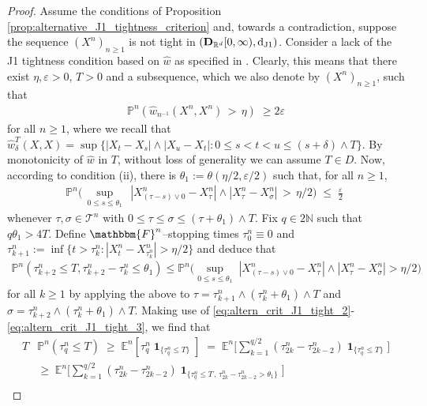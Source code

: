 \documentclass[11pt]{article}
\theoremstyle{definition}\newtheorem{example}[theorem]{Example}
\theoremstyle{definition}\newtheorem{counterexample}[theorem]{Counterexample}
\theoremstyle{definition}\newtheorem{remark}[theorem]{Remark}
\theoremstyle{definition}\newtheorem{defi}[theorem]{Definition}
\numberwithin{equation}{section}
\newcommand{\N}{\mathbb{N}}
\newcommand{\R}{\mathbb{R}}
\newcommand{\D}{{\bf D}}											%
\newcommand*\diff{\mathop{}\!\mathrm{d}}								%
\newcommand{\E}{\mathbb{E}}											%
\newcommand{\Pro}{\mathbb{P}}										%
\newcommand{\ind}{\operatorname{\mathbf{1}}}							%
\renewcommand{\sup}[1]{\underset{#1}{\operatorname{sup}}\;}					%
\renewcommand{\|}{\; : \, \;}											%
\newcommand{\dJ}{\diff_{\operatorname{J1}}}								%
\begin{document}
\begin{proof} Assume the conditions of Proposition \ref{prop:alternative_J1_tightness_criterion} and, towards a contradiction, suppose the sequence $(X^n)_{n \ge 1}$ is not tight in $(\D_{\R^d}[0,\infty), \dJ)$. Consider a lack of the J1 tightness condition based on $\hat w$ as specified in \cite[Thm.~12.4]{billingsley}. Clearly, this means that there exist $\eta,\varepsilon >0$, $T>0$ and a subsequence, which we also denote by $(X^{n})_{n\ge 1}$, such that 
	\begin{align}
		\Pro^n \left( \hat w_{n^{-1}}(X^n,X^n) \, > \, \eta \right) \; \ge 2\varepsilon \label{eq:altern_crit_J1_tight_1}
	\end{align}
	for all $n\ge 1$, where we recall that $\hat w^T_\delta(X,X)= \operatorname{sup}\{ |X_t-X_s| \wedge |X_u-X_t| : 0\le s < t<u\le (s+\delta)\wedge T\}$. By monotonicity of $\hat w$ in $T$, without loss of generality we can assume $T \in D$. Now, according to condition (ii), there 
	is $\theta_1:=\theta(\eta/2,\varepsilon/2)$ such that, for all $n\ge 1$,
	\begin{align} 
		\Pro^n\Big( \, \sup{0\le s \le \theta_1} \, |X^n_{(\tau-s)\vee 0}-X^n_\tau|\wedge |X^n_{\tau}-X^n_{\sigma}| \, > \, \eta/2 \Big) \; \le \; \frac \varepsilon 2\; \label{eq:altern_crit_J1_tight_2}
	\end{align}
	whenever $\tau, \sigma \in \mathcal{T}^n$ with $0\le \tau \le \sigma \le (\tau+ \theta_1)\wedge T$. Fix $q \in 2\N$ such that $q \theta_1> 4T$. Define $\mathbbm{F}^n$--stopping times $\tau^n_0 \equiv 0$ and $\tau^n_{k+1}:= \operatorname{inf}\{t>\tau^n_{k} : |X^n_t-X^n_{\tau^n_k}|> \eta/2\}$ and deduce that 
	\begin{align} 
		\Pro^n ( \tau^n_{k+2} \le T ,  \tau^n_{k+2}-\tau^n_{k} \le \theta_1) \le  \Pro^n\Big(  \sup{0\le s \le \theta_1}  |X^n_{(\tau -s)\vee 0}-X^n_{\tau}|\wedge |X^n_{\tau}-X^n_{\sigma}|  > \eta/2 \Big) \label{eq:altern_crit_J1_tight_3}
	\end{align}
	for all $k\ge 1$ by applying the above to $\tau=\tau^n_{k+1}\wedge (\tau^n_k +\theta_1)\wedge T$ and $\sigma=\tau^n_{k+2}\wedge (\tau^n_k +\theta_1)\wedge T$. Making use of \eqref{eq:altern_crit_J1_tight_2}-\eqref{eq:altern_crit_J1_tight_3}, we find that 
	\begin{align*}
		T &\Pro^n( \tau^n_q \le T) \; \ge \; \E^n[ \tau^n_q \ind_{\{\tau^n_q \le T\}}] \; = \; \E^n\Big[ \sum_{k=1}^{q/2} (\tau^n_{2k}-\tau^n_{2k-2}) \ind_{\{\tau^n_q \le T\}} \Big] \\[-4pt]
		\;\;&\ge \; \E^n\Big[ \sum_{k=1}^{q/2} (\tau^n_{2k}-\tau^n_{2k-2}) \ind_{\{\tau^n_q \le T\, , \, \tau^n_{2k}-\tau^n_{2k-2} > \theta_1 \}} \Big] \\

\end{align*}
\end{proof}
\end{document}
